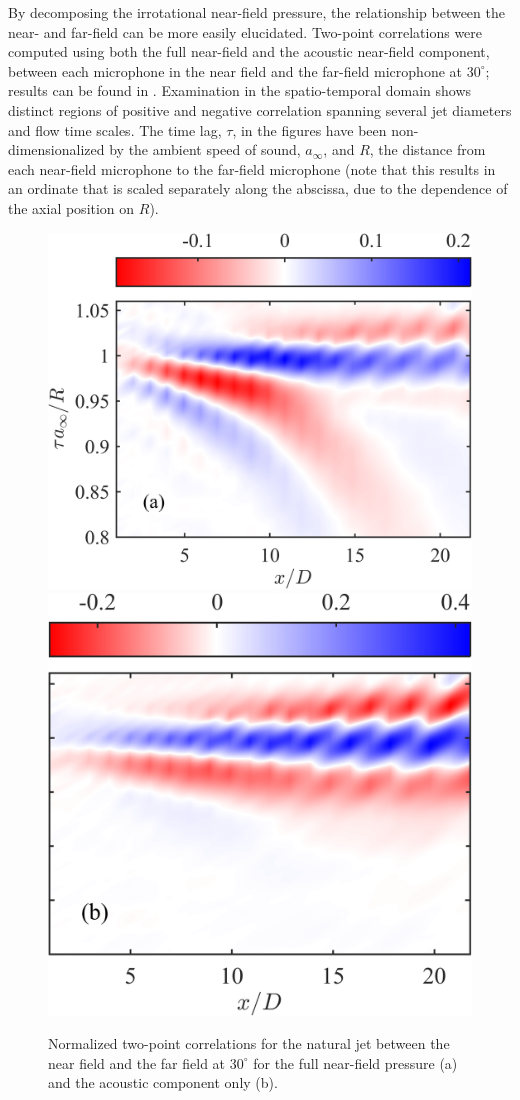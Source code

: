 By decomposing the irrotational near-field pressure, the relationship between the near- and far-field can be more easily elucidated. 
Two-point correlations were computed using both the full near-field and the acoustic near-field component, between each microphone in the near field and the far-field microphone at $30^\circ$; results can be found in . 
Examination in the spatio-temporal domain shows distinct regions of positive and negative correlation spanning several jet diameters and flow time scales.
The time lag, $\tau$, in the figures have been non-dimensionalized by the ambient speed of sound, $a_\infty$, and $R$, the distance from each near-field microphone to the far-field microphone (note that this results in an ordinate that is scaled separately along the abscissa, due to the dependence of the axial position on $R$).
\begin{figure}
	\centering
		\includegraphics[width=0.475\linewidth]{Figures/sect_nearfield_fullxcorr.png}
		\includegraphics[width=0.401\linewidth]{Figures/sect_nearfield_acousticxcorr.png}
	\caption{Normalized two-point correlations for the natural jet between the near field and the far field at $30^\circ$ for the full near-field pressure (a) and the acoustic component only (b).}
	\label{fig:ch3_full_vs_partial_xcorr}
\end{figure}

